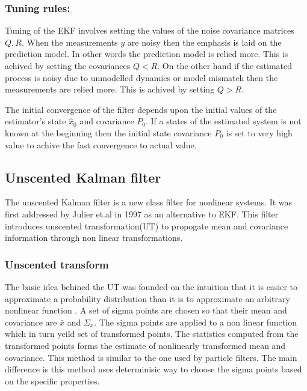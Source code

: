 \subsubsection{Tuning rules:}
Tuning of the EKF involves setting the values of the noise covariance matrices $Q,R$. When the measurements $y$ are noisy then the emphasis is laid on the prediction model. In other words the prediction model is relied more. This is achived by setting the covariances $Q<R$. On the other hand if the estimated process is noisy due to unmodelled dynamics or model mismatch then the measurements are relied more. This is achived by setting $Q>R$.

The initial convergence of the filter depends upon the initial values of the estimator's state $\hat x_0$ and covariance $P_0$. If a states of the estimated system is not known at the beginning then the initial state covariance $P_0$ is set to very high value to achive the fast convergence to actual value.

\subsection{Unscented Kalman filter}
The unscented Kalman filter is a new class filter for nonlinear systems. It was first addressed by Julier et.al in 1997 \citep{jul97} as an alternative to EKF. This filter introduces unscented transformation(UT) to propogate mean and covariance information through non linear transformations.

\subsubsection{Unscented transform}
The basic idea behined the UT was founded on the intuition that it is easier to approximate a probability distribution than it is to approximate an arbitrary nonlinear function \citep{jul04}. A set of sigma points are chosen so that their mean and covariance are $\bar x$ and $\Sigma_x$. The sigma points are applied to a non linear function which in turn yeild set of transformed points. The statistics computed from the transformed points forms the estimate of nonlinearly transformed mean and covariance. This method is similar to the one used by particle filters. The main difference is this method uses determinisic way to choose the sigma points based on the specific properties. 

